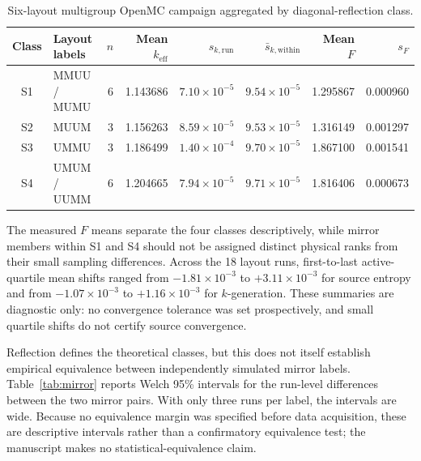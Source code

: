 \documentclass[conference]{IEEEtran}
\begin{document}
\begin{table}[t]
\caption{Six-layout multigroup OpenMC campaign aggregated by diagonal-reflection class.}
\label{tab:classes}
\centering
\small
\setlength{\tabcolsep}{5pt}
\begin{tabular}{c l r r r r r r}
\toprule
Class & Layout labels & \(n\) & Mean \(k_{\mathrm{eff}}\) & \(s_{k,\mathrm{run}}\) & \(\bar{s}_{k,\mathrm{within}}\) & Mean \(F\) & \(s_F\)\\
\midrule
S1 & MMUU / MUMU & 6 & 1.143686 & \(7.10{\times}10^{-5}\) & \(9.54{\times}10^{-5}\) & 1.295867 & 0.000960\\
S2 & MUUM & 3 & 1.156263 & \(8.59{\times}10^{-5}\) & \(9.53{\times}10^{-5}\) & 1.316149 & 0.001297\\
S3 & UMMU & 3 & 1.186499 & \(1.40{\times}10^{-4}\) & \(9.70{\times}10^{-5}\) & 1.867100 & 0.001541\\
S4 & UMUM / UUMM & 6 & 1.204665 & \(7.94{\times}10^{-5}\) & \(9.71{\times}10^{-5}\) & 1.816406 & 0.000673\\
\bottomrule
\end{tabular}
\end{table}

The measured \(F\) means separate the four classes descriptively, while mirror members within S1 and S4 should not be assigned distinct physical ranks from their small sampling differences. Across the 18 layout runs, first-to-last active-quartile mean shifts ranged from \(-1.81\times10^{-3}\) to \(+3.11\times10^{-3}\) for source entropy and from \(-1.07\times10^{-3}\) to \(+1.16\times10^{-3}\) for \(k\)-generation. These summaries are diagnostic only: no convergence tolerance was set prospectively, and small quartile shifts do not certify source convergence.

Reflection defines the theoretical classes, but this does not itself establish empirical equivalence between independently simulated mirror labels. Table~\ref{tab:mirror} reports Welch 95\% intervals for the run-level differences between the two mirror pairs. With only three runs per label, the intervals are wide. Because no equivalence margin was specified before data acquisition, these are descriptive intervals rather than a confirmatory equivalence test; the manuscript makes no statistical-equivalence claim.
\end{document}
